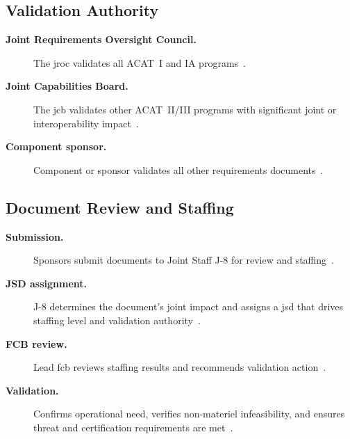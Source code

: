 \documentclass[../main.tex]{subfiles}
\begin{document}
\subsection{Validation Authority}
\begin{description}
  \item[\textbf{Joint Requirements Oversight Council.}] The \ac{jroc} validates all ACAT~I and IA programs~\autocite{edo-3-3-3-jcids-2025}.
  \item[\textbf{Joint Capabilities Board.}] The \ac{jcb} validates other ACAT~II/III programs with significant joint or interoperability impact~\autocite{edo-3-3-3-jcids-2025}.
  \item[\textbf{Component sponsor.}] Component or sponsor validates all other requirements documents~\autocite{edo-3-3-3-jcids-2025}.
\end{description}

\subsection{Document Review and Staffing}
\begin{description}
  \item[\textbf{Submission.}] Sponsors submit documents to Joint Staff J-8 for review and staffing~\autocite{edo-3-3-3-jcids-2025}.
  \item[\textbf{JSD assignment.}] J-8 determines the document's joint impact and assigns a \ac{jsd} that drives staffing level and validation authority~\autocite{edo-3-3-3-jcids-2025}.
  \item[\textbf{FCB review.}] Lead \ac{fcb} reviews staffing results and recommends validation action~\autocite{edo-3-3-3-jcids-2025}.
  \item[\textbf{Validation.}] Confirms operational need, verifies non-materiel infeasibility, and ensures threat and certification requirements are met~\autocite{edo-3-3-3-jcids-2025}.
\end{description}
\end{document}
